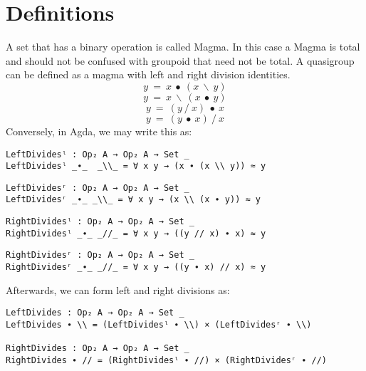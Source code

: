 \section{Definitions}
A set that has a binary operation is called Magma. In this case a Magma is total
and should not be confused with groupoid that need not be total. A quasigroup
can be defined as a magma with left and right division identities.
\begin{equation} \label{eq_L-leftdivides}
y\ =\ x\ ∙\ (x\ \backslash\ y)
\end{equation}
\begin{equation} \label{eq_L-rightdivides}
y\ =\ x\ \backslash\ (x\ ∙\ y)
\end{equation}
\begin{equation} \label{eq_R-leftdivides}
y\ =\ (y\ /\ x)\ ∙\ x
\end{equation}
\begin{equation} \label{eq_Rirightdivides}
y\ =\ (y\ ∙\ x)\ /\ x
\end{equation}
Conversely, in Agda, we may write this as:
\begin{verbatim}
LeftDividesˡ : Op₂ A → Op₂ A → Set _
LeftDividesˡ _∙_  _\\_ = ∀ x y → (x ∙ (x \\ y)) ≈ y
\end{verbatim}
\begin{verbatim}
LeftDividesʳ : Op₂ A → Op₂ A → Set _
LeftDividesʳ _∙_ _\\_ = ∀ x y → (x \\ (x ∙ y)) ≈ y
\end{verbatim}
\begin{verbatim}
RightDividesˡ : Op₂ A → Op₂ A → Set _
RightDividesˡ _∙_ _//_ = ∀ x y → ((y // x) ∙ x) ≈ y
\end{verbatim}
\begin{verbatim}
RightDividesʳ : Op₂ A → Op₂ A → Set _
RightDividesʳ _∙_ _//_ = ∀ x y → ((y ∙ x) // x) ≈ y
\end{verbatim}

Afterwards, we can form left and right divisions as:

\begin{verbatim}
LeftDivides : Op₂ A → Op₂ A → Set _
LeftDivides ∙ \\ = (LeftDividesˡ ∙ \\) × (LeftDividesʳ ∙ \\)

RightDivides : Op₂ A → Op₂ A → Set _
RightDivides ∙ // = (RightDividesˡ ∙ //) × (RightDividesʳ ∙ //)
\end{verbatim}

